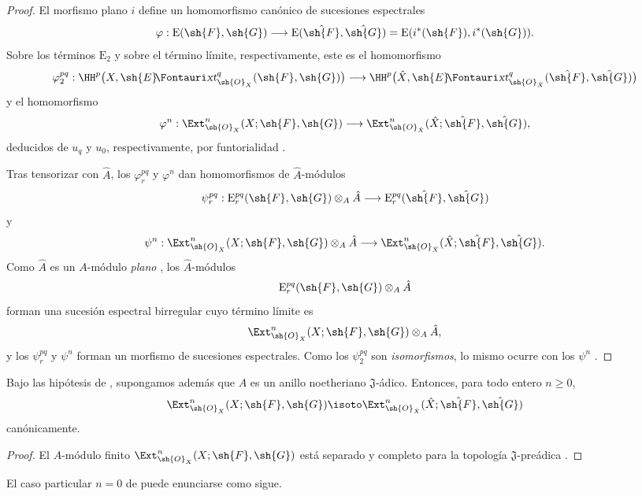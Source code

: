 \documentclass[oneside]{amsart}
\makeatletter
\renewcommand{\geq}{\geqslant}
\newcommand*{\ega@sheafop}[3]{\sh{#1}#2\textup{\kern-2.2pt{\Fontauri\slshape #3}}}
\newcommand*{\shExt}{\ega@sheafop{E}{}{xt}}
\let\EGAOriginalLabel\label
\renewcommand{\label}[1]{\phantomsection\EGAOriginalLabel{#1}}
\makeatother
\begin{document}
\begin{proof}
El morfismo plano $i$ define un homomorfismo canónico de sucesiones
espectrales
\[
  \varphi:\mathrm{E}(\sh{F},\sh{G})
  \longrightarrow
  \mathrm{E}(\hat{\sh{F}},\hat{\sh{G}})
  =
  \mathrm{E}(i^*(\sh{F}),i^*(\sh{G})).
\]
Sobre los términos $\mathrm{E}_2$ y sobre el término límite,
respectivamente, este es el homomorfismo
\[
  \varphi_2^{pq}:
  \HH^p\bigl(X,\shExt^q_{\sh{O}_X}(\sh{F},\sh{G})\bigr)
  \longrightarrow
  \HH^p\bigl(\hat{X},
    \shExt^q_{\sh{O}_{\hat{X}}}
      (\hat{\sh{F}},\hat{\sh{G}})\bigr)
\]
y el homomorfismo
\[
  \varphi^n:
  \Ext^n_{\sh{O}_X}(X;\sh{F},\sh{G})
  \longrightarrow
  \Ext^n_{\sh{O}_{\hat{X}}}
    (\hat{X};\hat{\sh{F}},\hat{\sh{G}}),
\]
deducidos de $u_q$ y $u_0$, respectivamente, por funtorialidad
.

Tras tensorizar con $\hat{A}$, los $\varphi_r^{pq}$ y
$\varphi^n$ dan homomorfismos de $\hat{A}$-módulos
\[
  \psi_r^{pq}:
  \mathrm{E}_r^{pq}(\sh{F},\sh{G})\otimes_A\hat{A}
  \longrightarrow
  \mathrm{E}_r^{pq}(\hat{\sh{F}},\hat{\sh{G}})
\]
y
\[
  \psi^n:
  \Ext^n_{\sh{O}_X}(X;\sh{F},\sh{G})\otimes_A\hat{A}
  \longrightarrow
  \Ext^n_{\sh{O}_{\hat{X}}}
    (\hat{X};\hat{\sh{F}},\hat{\sh{G}}).
\]
Como $\hat{A}$ es un $A$-módulo \emph{plano} , los
$\hat{A}$-módulos
\[
  \mathrm{E}_r^{pq}(\sh{F},\sh{G})\otimes_A\hat{A}
\]
forman una sucesión espectral birregular cuyo término límite es
\[
  \Ext^n_{\sh{O}_X}(X;\sh{F},\sh{G})\otimes_A\hat{A},
\]
y los $\psi_r^{pq}$ y $\psi^n$ forman un morfismo de sucesiones
espectrales. Como los $\psi_2^{pq}$ son \emph{isomorfismos}, lo mismo ocurre
con los $\psi^n$ .
\end{proof}

\begin{corollary}[4.5.2]
\label{III.4.5.2}
Bajo las hipótesis de , supongamos además que $A$ es
un anillo noetheriano $\mathfrak J$-ádico. Entonces, para todo entero
$n\geq0$,
\[
  \Ext^n_{\sh{O}_X}(X;\sh{F},\sh{G})
  \isoto
  \Ext^n_{\sh{O}_{\hat{X}}}
    (\hat{X};\hat{\sh{F}},\hat{\sh{G}})
\]
canónicamente.
\end{corollary}

\begin{proof}
El $A$-módulo finito
$\Ext^n_{\sh{O}_X}(X;\sh{F},\sh{G})$ está separado y completo para la
topología $\mathfrak J$-preádica .
\end{proof}

El caso particular $n=0$ de  puede enunciarse como
sigue.
\end{document}
